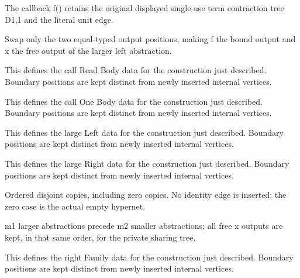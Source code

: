 The callback f() retains the original displayed single-use term contraction tree D1,1 and the literal unit edge.
\par{}

Swap only the two equal-typed output positions, making f the bound output and x the free output of the larger left abstraction.
\par{}

This defines the call Read Body data for the construction just described. Boundary positions are kept distinct from newly inserted internal vertices.
\par{}

This defines the call One Body data for the construction just described. Boundary positions are kept distinct from newly inserted internal vertices.
\par{}

This defines the large Left data for the construction just described. Boundary positions are kept distinct from newly inserted internal vertices.
\par{}

This defines the large Right data for the construction just described. Boundary positions are kept distinct from newly inserted internal vertices.
\par{}

Ordered disjoint copies, including zero copies. No identity edge is inserted: the zero case is the actual empty hypernet.
\par{}

m1 larger abstractions precede m2 smaller abstractions; all free x outputs are kept, in that same order, for the private sharing tree.
\par{}

This defines the right Family data for the construction just described. Boundary positions are kept distinct from newly inserted internal vertices.
\par{}

